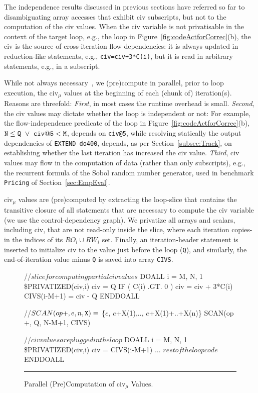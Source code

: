 \documentclass{sig-alternate}
\newcommand{\mymath}[1]{$ #1 $}
\begin{document}
The independence results discussed in previous sections have referred 
so far to disambiguating array accesses that exhibit {\sc civ} 
subscripts, but not to the computation of the {\sc civ} values.
%
When the {\sc civ} variable is not privatisable in the context of the 
target loop, e.g., the loop in Figure~\ref{fig:codeActforCorrec}(b), 
the {\sc civ} is the source of cross-iteration flow dependencies: %
it is always updated in reduction-like statements, e.g., {\tt civ=civ+3*C(i)},
but it is read in arbitrary statements, e.g., in a subscript.


While not always necessary~\cite{PaduaStackArr}, we  (pre)compute in %
parallel, prior to loop execution, the {\sc civ}$_\mu$ values at the beginning 
of each (chunk of) iteration(s).
Reasons are threefold: {\em First}, in most cases %
the runtime overhead is small. {\em Second}, the {\sc civ} values may dictate
whether the loop is independent or not: For example,  the flow-independence
predicate of the loop in Figure~\ref{fig:codeActforCorrec}(b), 
${\tt N} \le {\tt Q}~\vee~{\tt civ@5} < {\tt M}$,
depends on {\tt civ@5}, while resolving statically the output 
dependencies of {\tt EXTEND\_do400}, depends, as
per Section~\ref{subsec:Track}, on establishing whether the last
iteration has increased the {\sc civ} value. 
%
{\em Third}, {\sc civ} values may flow in the computation
of data (rather than only subscripts), e.g., the recurrent
formula of the Sobol random number generator, used in
benchmark {\tt Pricing}  of Section~\ref{sec:EmpEval}.

{\sc civ}$_\mu$ values are (pre)computed by extracting the loop-slice
that contains the transitive closure of all statements 
that are necessary to compute the {\sc civ} variable
(we use the control-dependency graph). 
We privatize all arrays and scalars, including {\sc civ}, that are not 
read-only inside the slice, where each iteration copies-in the  indices 
of its $RO_i \cup RW_i$ set. Finally, an iteration-header statement is 
inserted to initialize {\sc civ} to the value just before the loop ({\tt Q}), 
and similarly, the end-of-iteration value minus {\tt Q} is saved into array 
{\tt CIVS}.  


\begin{figure}
\begin{colorcode}
//\mymath{slice for computing partial civ values}
DOALL i = M, N, 1      \$PRIVATIZED(civ,i)
  civ = Q
  IF ( C(i) .GT. 0 ) civ = civ + 3*C(i)
  CIVS(i-M+1) = civ - Q
ENDDOALL

//\mymath{SCAN(op {\tt{}+}, e, n, {\tt{}X}) \equiv} \{\mymath{e}, \mymath{e}+X(1),.., \mymath{e}+X(1)+..+X(n)\}
SCAN(op +, Q, N-M+1, CIVS)

//\mymath{civ values are plugged in the loop}
DOALL i = M, N, 1      \$PRIVATIZED(civ,i)
  civ = CIVS(i-M+1)
  ... \mymath{rest of the loop code}
ENDDOALL
\end{colorcode}
\vspace{-1ex}
\hrule
\vspace{-0.5ex}
\caption{ Parallel (Pre)Computation of {\sc civ}$_\mu$ Values.}
\label{fig:CivSlice} %
\end{figure}
\end{document}

